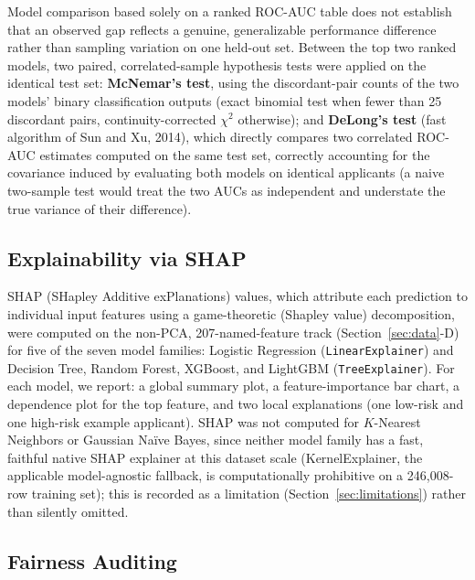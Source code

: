 \documentclass[journal]{IEEEtran}
\begin{document}
Model comparison based solely on a ranked ROC-AUC table does not establish that an observed gap reflects a genuine, generalizable performance difference rather than sampling variation on one held-out set. Between the top two ranked models, two paired, correlated-sample hypothesis tests were applied on the identical test set: \textbf{McNemar's test}, using the discordant-pair counts of the two models' binary classification outputs (exact binomial test when fewer than 25 discordant pairs, continuity-corrected $\chi^2$ otherwise); and \textbf{DeLong's test} (fast algorithm of Sun and Xu, 2014), which directly compares two correlated ROC-AUC estimates computed on the same test set, correctly accounting for the covariance induced by evaluating both models on identical applicants (a naive two-sample test would treat the two AUCs as independent and understate the true variance of their difference).

\subsection{Explainability via SHAP}

SHAP (SHapley Additive exPlanations) values, which attribute each prediction to individual input features using a game-theoretic (Shapley value) decomposition, were computed on the non-PCA, 207-named-feature track (Section~\ref{sec:data}-D) for five of the seven model families: Logistic Regression (\texttt{LinearExplainer}) and Decision Tree, Random Forest, XGBoost, and LightGBM (\texttt{TreeExplainer}). For each model, we report: a global summary plot, a feature-importance bar chart, a dependence plot for the top feature, and two local explanations (one low-risk and one high-risk example applicant). SHAP was not computed for $K$-Nearest Neighbors or Gaussian Naïve Bayes, since neither model family has a fast, faithful native SHAP explainer at this dataset scale (KernelExplainer, the applicable model-agnostic fallback, is computationally prohibitive on a 246,008-row training set); this is recorded as a limitation (Section~\ref{sec:limitations}) rather than silently omitted.

\subsection{Fairness Auditing}
\end{document}
